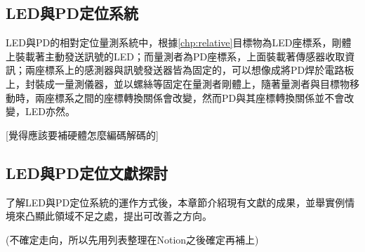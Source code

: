     
    
    

        
        
        
        
        
        


        



    \subsection{LED與PD定位系統}

        LED與PD的相對定位量測系統中，根據\ref{chp:relative}目標物為LED座標系，剛體上裝載著主動發送訊號的LED；而量測者為PD座標系，上面裝載著傳感器收取資訊；兩座標系上的感測器與訊號發送器皆為固定的，可以想像成將PD焊於電路板上，封裝成一量測儀器，並以螺絲等固定在量測者剛體上，隨著量測者與目標物移動時，兩座標系之間的座標轉換關係會改變，然而PD與其座標轉換關係並不會改變，LED亦然。

        [覺得應該要補硬體怎麼編碼解碼的]



    \subsection{LED與PD定位文獻探討}

        了解LED與PD定位系統的運作方式後，本章節介紹現有文獻的成果，並舉實例情境來凸顯此領域不足之處，提出可改善之方向。
        
        (不確定走向，所以先用列表整理在Notion之後確定再補上)

